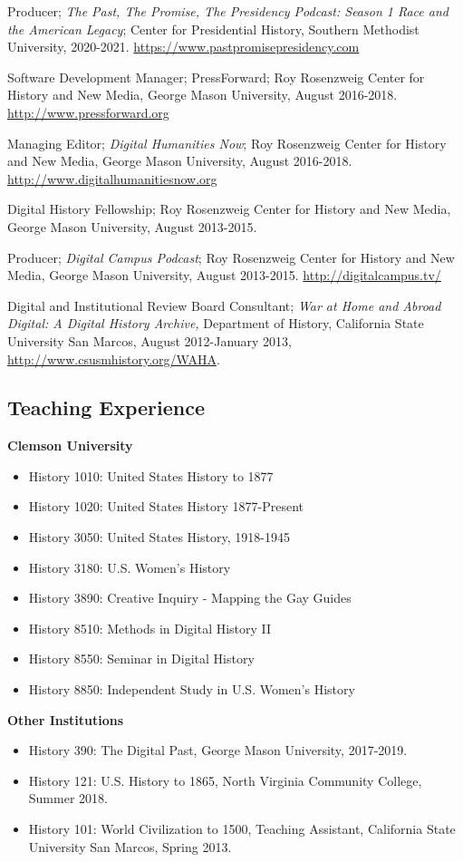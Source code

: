\documentclass[11pt]{article}
\begin{document}
Producer; \emph{The Past, The Promise, The Presidency Podcast: Season 1 Race and the American Legacy}; Center for Presidential History, Southern Methodist University, 2020-2021. \url{https://www.pastpromisepresidency.com}

Software Development Manager; PressForward; Roy Rosenzweig Center for History and New Media, George Mason University, August 2016-2018. \url{http://www.pressforward.org}

Managing Editor; \emph{Digital Humanities Now}; Roy Rosenzweig Center for History and New Media, George Mason University, August 2016-2018. \url{http://www.digitalhumanitiesnow.org}

Digital History Fellowship; Roy Rosenzweig Center for History and New Media, George Mason University, August 2013-2015.

Producer; \emph{Digital Campus Podcast}; Roy Rosenzweig Center for History and New Media, George Mason University, August 2013-2015. \url{http://digitalcampus.tv/}

Digital and Institutional Review Board Consultant; \emph{War at Home and Abroad Digital: A Digital History Archive,} Department of History, California State University San Marcos, August 2012-January 2013, \url{http://www.csusmhistory.org/WAHA}.

\subsection{Teaching Experience}

\textbf{Clemson University}
\begin{itemize}
  \itemsep0em 
  \item History 1010: United States History to 1877
  \item History 1020: United States History 1877-Present
  \item History 3050: United States History, 1918-1945
  \item History 3180: U.S. Women's History
  \item History 3890: Creative Inquiry - Mapping the Gay Guides
  \item History 8510: Methods in Digital History II
  \item History 8550: Seminar in Digital History
  \item History 8850: Independent Study in U.S. Women's History
\end{itemize}
\textbf{Other Institutions}
\begin{itemize}
  \itemsep0em 
  \item History 390: The Digital Past, George Mason University, 2017-2019.
  \item History 121: U.S. History to 1865, North Virginia Community College, Summer 2018.
  \item History 101: World Civilization to 1500, Teaching Assistant, California State University San Marcos, Spring 2013.
\end{itemize}
\end{document}
